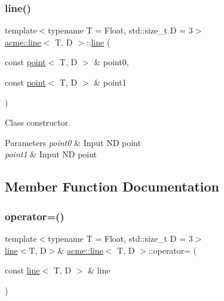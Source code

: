 \subsubsection{\texorpdfstring{line()}{line()}}
{\footnotesize\ttfamily template$<$typename T = Float, std\+::size\+\_\+t D = 3$>$ \\
\hyperlink{classacme_1_1line}{acme\+::line}$<$ T, D $>$\+::\hyperlink{classacme_1_1line}{line} (\begin{DoxyParamCaption}\item[{const \hyperlink{classacme_1_1point}{point}$<$ T, D $>$ \&}]{point0,  }\item[{const \hyperlink{classacme_1_1point}{point}$<$ T, D $>$ \&}]{point1 }\end{DoxyParamCaption})\hspace{0.3cm}{\ttfamily [inline]}}



Class constructor. 


\begin{DoxyParams}{Parameters}
{\em point0} & Input ND point \\
\hline
{\em point1} & Input ND point \\
\hline
\end{DoxyParams}


\subsection{Member Function Documentation}
\mbox{\label{classacme_1_1line_acb882fdc149ed751a681151bcb7d4505}} 
\subsubsection{\texorpdfstring{operator=()}{operator=()}}
{\footnotesize\ttfamily template$<$typename T = Float, std\+::size\+\_\+t D = 3$>$ \\
\hyperlink{classacme_1_1line}{line}$<$T, D$>$\& \hyperlink{classacme_1_1line}{acme\+::line}$<$ T, D $>$\+::operator= (\begin{DoxyParamCaption}\item[{const \hyperlink{classacme_1_1line}{line}$<$ T, D $>$ \&}]{line }\end{DoxyParamCaption})\hspace{0.3cm}{\ttfamily [inline]}}



